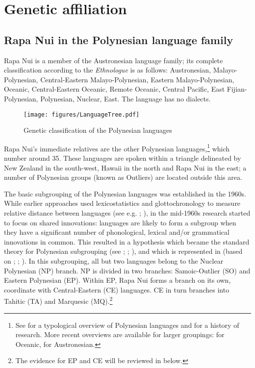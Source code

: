 \section{Genetic affiliation}\label{sec:1.2}
\subsection{Rapa Nui in the Polynesian language family}\label{sec:1.2.1}

Rapa Nui is a member of the Austronesian language family; its complete classification according to the \textit{Ethnologue} \citep{LewisSimons2015} is as follows: Austronesian, Ma\-la\-yo-Polynesian, Central-Eastern Malayo-Polynesian, Eastern Malayo-Polynesian, Oce\-anic, Central-Eastern Oceanic, Remote Oceanic, Central Pacific, East Fijian-Polynesian, Polynesian, Nuclear, East. The language has no dialects.

\begin{figure}
\texttt{[image: figures/LanguageTree.pdf]}
\caption{Genetic classification of the Polynesian languages}
\label{fig:1}
\end{figure}

Rapa Nui’s immediate relatives are the other Polynesian languages,\footnote{\label{fn:11}See \citet{Krupa1982} for a typological overview of Polynesian languages and \citet{Krupa1973} for a history of research. More recent overviews are available for larger groupings: \citet{LynchRoss2002} for Oceanic, \citet{Blust2013} for Austronesian.} which number around 35. These languages are spoken within a triangle delineated by New Zealand in the south-west, Hawaii in the north and Rapa Nui in the east; a number of Polynesian groups (known as Outliers) are located outside this area.

The basic subgrouping of the Polynesian languages was established in the 1960s. While earlier approaches used lexicostatistics and glottochronology to measure relative distance between languages (see e.g. \citealt{Elbert1953}; \citealt{Emory1963}), in the mid-1960s research started to focus on shared innovations: languages are likely to form a subgroup when they have a significant number of phonological, lexical and/or grammatical innovations in common. This resulted in a hypothesis which became the standard theory for Polynesian subgrouping (see \citealt{Pawley1966}; \citealt{Green1966}; \citealt{Marck2000}), and which is represented in  (based on \citealt{Pawley1966}; \citealt{Clark1983Review}; \citealt{Marck2000}). In this subgrouping, all but two languages belong to the Nuclear Polynesian (NP) branch. NP is divided in two branches: Samoic-Outlier (SO) and Eastern Polynesian (EP). Within EP, Rapa Nui forms a branch on its own, coordinate with Central-Eastern (CE) languages. CE in turn branches into Tahitic (TA) and Marquesic (MQ).\footnote{\label{fn:12}The evidence for EP and CE will be reviewed in  below.}  

